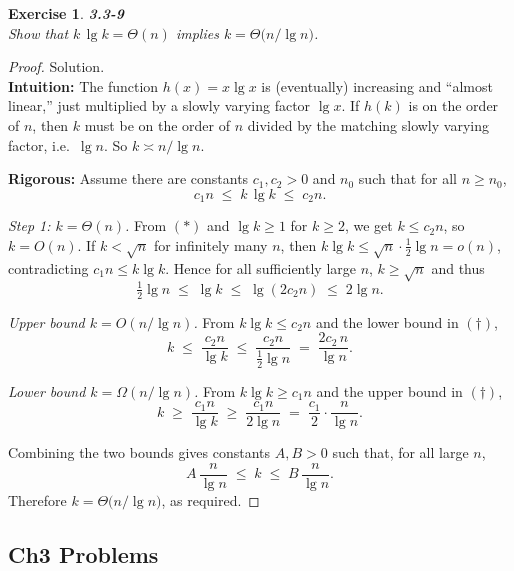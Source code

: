 \documentclass[12pt]{article}
\newtheorem{exercise}[theorem]{Exercise}
\theoremstyle{definition}
\begin{document}
\begin{exercise}
\noindent
\textbf{3.3-9} \\
Show that $k\,\lg k=\Theta(n)$ implies $k=\Theta\!\big(n/\lg n\big)$.
\end{exercise}

\begin{proof}
Solution. \\

\noindent
\textbf{Intuition:}
The function $h(x)=x\lg x$ is (eventually) increasing and “almost linear,”
just multiplied by a slowly varying factor $\lg x$.
If $h(k)$ is on the order of $n$, then $k$ must be on the order of $n$ divided by
the matching slowly varying factor, i.e.\ $\lg n$.
So $k\asymp n/\lg n$.

\noindent
\textbf{Rigorous:}
Assume there are constants $c_1,c_2>0$ and $n_0$ such that for all $n\ge n_0$,
\[
c_1 n \;\le\; k\,\lg k \;\le\; c_2 n .
\tag{$\ast$}
\]

\emph{Step 1: $k=\Theta(n)$.}
From $(\ast)$ and $\lg k\ge 1$ for $k\ge 2$, we get $k\le c_2 n$, so $k=O(n)$.
If $k<\sqrt{n}$ for infinitely many $n$, then
$k\lg k \le \sqrt{n}\cdot \tfrac12\lg n = o(n)$, contradicting $c_1 n\le k\lg k$.
Hence for all sufficiently large $n$, $k\ge \sqrt{n}$ and thus
\[
\tfrac12\lg n \;\le\; \lg k \;\le\; \lg(2c_2 n) \;\le\; 2\lg n .
\tag{$\dagger$}
\]

\emph{Upper bound $k=O(n/\lg n)$.}
From $k\lg k\le c_2 n$ and the lower bound in $(\dagger)$,
\[
k \;\le\; \frac{c_2 n}{\lg k} \;\le\; \frac{c_2 n}{\tfrac12\lg n}
\;=\; \frac{2c_2\,n}{\lg n}.
\]

\emph{Lower bound $k=\Omega(n/\lg n)$.}
From $k\lg k\ge c_1 n$ and the upper bound in $(\dagger)$,
\[
k \;\ge\; \frac{c_1 n}{\lg k} \;\ge\; \frac{c_1 n}{2\lg n}
\;=\; \frac{c_1}{2}\cdot \frac{n}{\lg n}.
\]

Combining the two bounds gives constants $A,B>0$ such that, for all large $n$,
\[
A\,\frac{n}{\lg n} \;\le\; k \;\le\; B\,\frac{n}{\lg n}.
\]
Therefore $k=\Theta\!\big(n/\lg n\big)$, as required.
\end{proof}

\newpage

\subsection*{Ch3 Problems}
\end{document}
